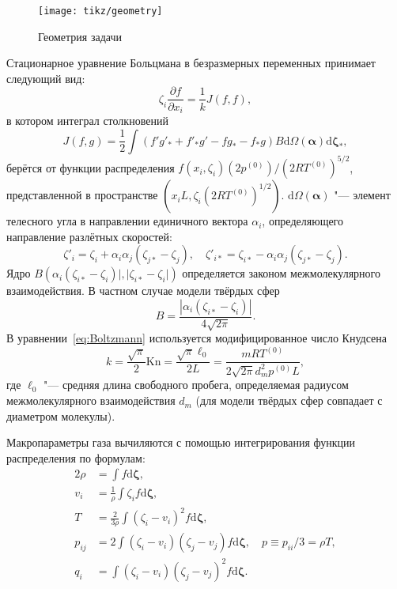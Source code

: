\documentclass[a4paper,12pt]{article}
\newcommand{\Kn}{\mathrm{Kn}}
\newcommand{\dd}{\mathrm{d}}
\newcommand{\pder}[2][]{\frac{\partial#1}{\partial#2}}
\begin{document}
\begin{figure}[ht]
    \centering
    \texttt{[image: tikz/geometry]}
    \caption{Геометрия задачи}
    \label{fig:geometry}
\end{figure}

Стационарное уравнение Больцмана в безразмерных переменных принимает следующий вид:
\begin{equation}\label{eq:Boltzmann}
    \zeta_i\pder[f]{x_i} = \frac1k J(f,f),
\end{equation}
в котором интеграл столкновений
\begin{equation}
    J(f,g) = \frac12 \int (f'g'_* + f'_*g' - fg_* - f_*g) B
    \dd \Omega(\boldsymbol{\alpha}) \boldsymbol{\dd \zeta_*},
\end{equation}
берётся от функции распределения \(f(x_i,\zeta_i)(2p^{(0)})/(2RT^{(0)})^{5/2}\), представленной
в пространстве \((x_iL, \zeta_i(2RT^{(0)})^{1/2})\).
\(\dd \Omega(\boldsymbol{\alpha})\) "--- элемент телесного угла в направлении единичного вектора \(\alpha_i\),
определяющего направление разлётных скоростей:
\[
    \zeta'_i = \zeta_i + \alpha_i\alpha_j(\zeta_{j*}-\zeta_j), \quad
    \zeta'_{i*} = \zeta_{i*} - \alpha_i\alpha_j(\zeta_{j*}-\zeta_j).
\]
Ядро \(B(\alpha_i(\zeta_{i*}-\zeta_i)|,|\zeta_{i*}-\zeta_i|)\)
определяется законом межмолекулярного взаимодействия.
В частном случае модели твёрдых сфер
\begin{equation}
    B = \frac{|\alpha_i(\zeta_{i*}-\zeta_i)|}{4\sqrt{2\pi}}.
\end{equation}
В уравнении~\eqref{eq:Boltzmann} используется модифицированное число Кнудсена
\begin{equation}
    k = \frac{\sqrt\pi}2 \Kn = \frac{\sqrt\pi\ell_0}{2L} =
    \frac{mRT^{(0)}}{2\sqrt{2\pi} d_m^2p^{(0)}L},
\end{equation}
где \(\ell_0\) "--- средняя длина свободного пробега, определяемая радиусом межмолекулярного
взаимодействия \(d_m\) (для модели твёрдых сфер совпадает с диаметром молекулы).

Макропараметры газа вычиляются с помощью интегрирования функции распределения по формулам:
\begin{alignat*}{2}
    \rho &= \int f \boldsymbol{\dd\zeta}, \\
    v_i &= \frac1{\rho} \int \zeta_i f \boldsymbol{\dd\zeta}, \\
    T &= \frac{2}{3\rho}\int(\zeta_i-v_i)^2 f \boldsymbol{\dd\zeta}, \\
    p_{ij} &= 2 \int(\zeta_i-v_i)(\zeta_j-v_j) f \boldsymbol{\dd\zeta},
        \quad p \equiv p_{ii}/3 = \rho T, \\
    q_i &= \int(\zeta_i-v_i)(\zeta_j-v_j)^2 f \boldsymbol{\dd\zeta}.
\end{alignat*}
\end{document}

